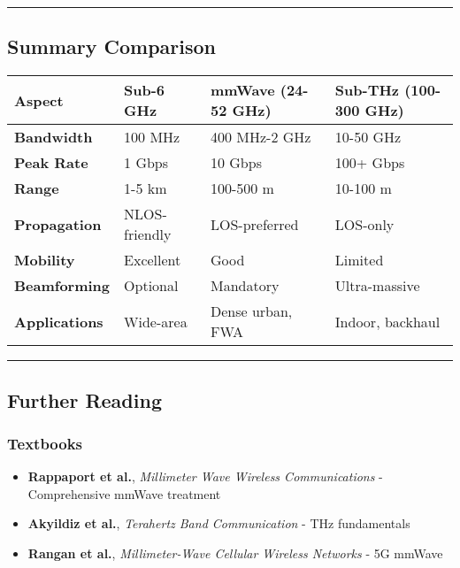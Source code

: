 \begin{center}\rule{0.5\linewidth}{0.5pt}\end{center}

\subsection{\texorpdfstring{ Summary
Comparison}{ Summary Comparison}}\label{summary-comparison}

{\def\LTcaptype{} %
\begin{longtable}[]{@{}llll@{}}
\toprule\noalign{}
Aspect & Sub-6 GHz & mmWave (24-52 GHz) & Sub-THz (100-300 GHz) \\
\midrule\noalign{}
\endhead
\bottomrule\noalign{}
\endlastfoot
\textbf{Bandwidth} & 100 MHz & 400 MHz-2 GHz & 10-50 GHz \\
\textbf{Peak Rate} & 1 Gbps & 10 Gbps & 100+ Gbps \\
\textbf{Range} & 1-5 km & 100-500 m & 10-100 m \\
\textbf{Propagation} & NLOS-friendly & LOS-preferred & LOS-only \\
\textbf{Mobility} & Excellent & Good & Limited \\
\textbf{Beamforming} & Optional & Mandatory & Ultra-massive \\
\textbf{Applications} & Wide-area & Dense urban, FWA & Indoor,
backhaul \\
\end{longtable}
}

\begin{center}\rule{0.5\linewidth}{0.5pt}\end{center}

\subsection{\texorpdfstring{ Further
Reading}{ Further Reading}}\label{further-reading}

\subsubsection{Textbooks}\label{textbooks}

\begin{itemize}
\tightlist
\item
  \textbf{Rappaport et al.}, \emph{Millimeter Wave Wireless
  Communications} - Comprehensive mmWave treatment
\item
  \textbf{Akyildiz et al.}, \emph{Terahertz Band Communication} - THz
  fundamentals
\item
  \textbf{Rangan et al.}, \emph{Millimeter-Wave Cellular Wireless
  Networks} - 5G mmWave
\end{itemize}

